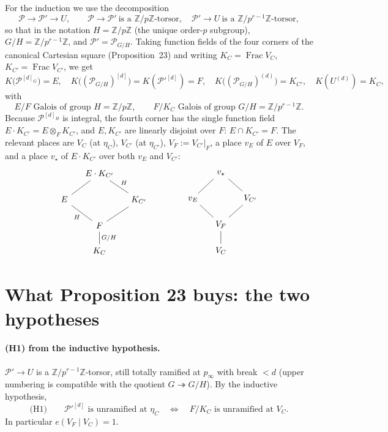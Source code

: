 \documentclass[11pt]{article}
\newcommand{\cP}{\mathcal{P}}
\newcommand{\Z}{\mathbb{Z}}
\DeclareMathOperator{\Frac}{Frac}
\theoremstyle{plain}
\theoremstyle{definition}
\begin{document}
For the induction we use the decomposition
\[
\cP \longrightarrow \cP' \longrightarrow U,
\qquad
\cP\to\cP' \ \text{is a } \Z/p\Z\text{-torsor},\quad
\cP'\to U \ \text{is a } \Z/p^{r-1}\Z\text{-torsor},
\]
so that in the notation $H=\Z/p\Z$ (the unique order-$p$ subgroup), $G/H=\Z/p^{r-1}\Z$, and
$\cP'=\cP_{G/H}$. Taking function fields of the four corners of the canonical Cartesian
square (Proposition~23) and writing $K_C=\Frac V_C$, $K_{C'}=\Frac V_{C'}$, we get
\[
K\!\big(\cP^{[d]_G}\big)=E,\quad
K\!\big((\cP_{G/H})^{[d]}\big)=K(\cP'^{[d]})=F,\quad
K\!\big((\cP_{G/H})^{(d)}\big)=K_{C'},\quad
K(U^{(d)})=K_C,
\]
with
\[
E/F \text{ Galois of group } H=\Z/p\Z,\qquad
F/K_C \text{ Galois of group } G/H=\Z/p^{r-1}\Z .
\]
Because $\cP^{[d]_H}$ is integral, the fourth corner has the single function field
$E\cdot K_{C'}=E\otimes_F K_{C'}$, and $E,K_{C'}$ are linearly disjoint over $F$:
$E\cap K_{C'}=F$. The relevant places are $V_C$ (at $\eta_C$), $V_{C'}$ (at $\eta_{C'}$),
$V_F:=V_{C'}|_F$, a place $v_E$ of $E$ over $V_F$, and a place $v_\star$ of $E\cdot K_{C'}$
over both $v_E$ and $V_{C'}$:
\[
\begin{tikzcd}[row sep=1.5em, column sep=1.2em]
 & E \cdot K_{C'} \arrow[dl, dash] \arrow[dr, dash, "H"] & \\
E \arrow[dr, dash, "H"'] & & K_{C'} \arrow[dl, dash] \\
 & F \arrow[d, dash, "G/H"] & \\
 & K_C &
\end{tikzcd}
\qquad\qquad
\begin{tikzcd}[row sep=1.5em, column sep=1.2em]
 & v_\star \arrow[dl, dash] \arrow[dr, dash] & \\
v_E \arrow[dr, dash] & & V_{C'} \arrow[dl, dash] \\
 & V_F \arrow[d, dash] & \\
 & V_C &
\end{tikzcd}
\]

\section{What Proposition 23 buys: the two hypotheses}

\paragraph{(H1) from the inductive hypothesis.}
$\cP'\to U$ is a $\Z/p^{r-1}\Z$-torsor, still totally ramified at $p_\infty$ with break
$<d$ (upper numbering is compatible with the quotient $G\twoheadrightarrow G/H$). By the
inductive hypothesis,
\[
\text{(H1)}\qquad \cP'^{[d]} \text{ is unramified at } \eta_C
\quad\Longleftrightarrow\quad F/K_C \text{ is unramified at } V_C .
\]
In particular $e(V_F\mid V_C)=1$.
\end{document}
